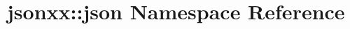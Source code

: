 \hypertarget{namespacejsonxx_1_1json}{}\section{jsonxx\+:\+:json Namespace Reference}
\label{namespacejsonxx_1_1json}

